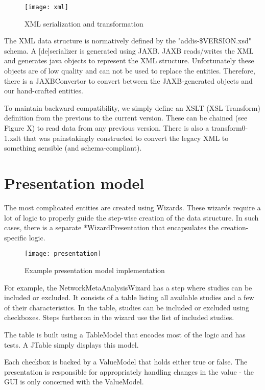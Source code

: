 \documentclass[a4paper]{article}
\begin{document}
\begin{figure}[h]
\centering
\texttt{[image: xml]}
\caption{XML serialization and transformation}
\end{figure}

The XML data structure is normatively defined by the "addis-\$VERSION.xsd" schema.
A [de]serializer is generated using JAXB.
JAXB reads/writes the XML and generates java objects to represent the XML structure.
Unfortunately these objects are of low quality and can not be used to replace the entities.
Therefore, there is a JAXBConvertor to convert between the JAXB-generated objects and our hand-crafted entities.

To maintain backward compatibility, we simply define an XSLT (XSL Transform) definition from the previous to the current version.
These can be chained (see Figure X) to read data from any previous version.
There is also a transform0-1.xslt that was painstakingly constructed to convert the legacy XML to something sensible (and schema-compliant).

\section{Presentation model}

The most complicated entities are created using Wizards.
These wizards require a lot of logic to properly guide the step-wise creation of the data structure.
In such cases, there is a separate *WizardPresentation that encapsulates the creation-specific logic.

\begin{figure}[h]
\centering
\texttt{[image: presentation]}
\caption{Example presentation model implementation}
\end{figure}

For example, the NetworkMetaAnalysisWizard has a step where studies can be included or excluded.
It consists of a table listing all available studies and a few of their characteristics.
In the table, studies can be included or excluded using checkboxes.
Steps furtheron in the wizard use the list of included studies.

The table is built using a TableModel that encodes most of the logic and has tests.
A JTable simply displays this model.

Each checkbox is backed by a ValueModel that holds either true or false.
The presentation is responsible for appropriately handling changes in the value - the GUI is only concerned with the ValueModel.
\end{document}
